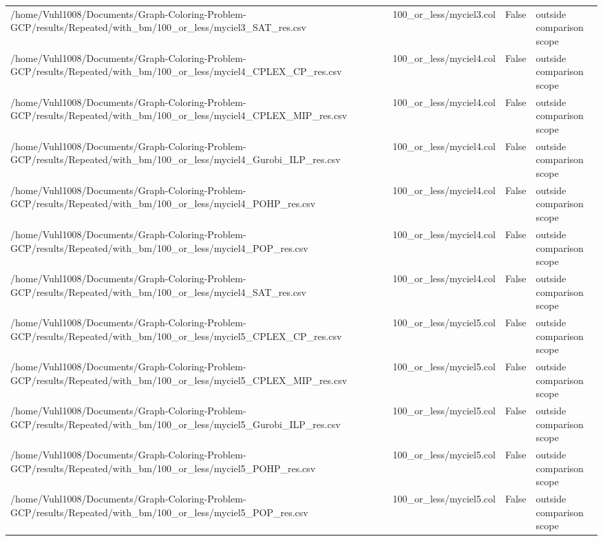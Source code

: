 \begin{table}[htbp]
\begin{tabular}{llll}
/home/Vuhl1008/Documents/Graph-Coloring-Problem-GCP/results/Repeated/with\_bm/100\_or\_less/myciel3\_SAT\_res.csv & 100\_or\_less/myciel3.col & False & outside comparison scope \\
/home/Vuhl1008/Documents/Graph-Coloring-Problem-GCP/results/Repeated/with\_bm/100\_or\_less/myciel4\_CPLEX\_CP\_res.csv & 100\_or\_less/myciel4.col & False & outside comparison scope \\
/home/Vuhl1008/Documents/Graph-Coloring-Problem-GCP/results/Repeated/with\_bm/100\_or\_less/myciel4\_CPLEX\_MIP\_res.csv & 100\_or\_less/myciel4.col & False & outside comparison scope \\
/home/Vuhl1008/Documents/Graph-Coloring-Problem-GCP/results/Repeated/with\_bm/100\_or\_less/myciel4\_Gurobi\_ILP\_res.csv & 100\_or\_less/myciel4.col & False & outside comparison scope \\
/home/Vuhl1008/Documents/Graph-Coloring-Problem-GCP/results/Repeated/with\_bm/100\_or\_less/myciel4\_POHP\_res.csv & 100\_or\_less/myciel4.col & False & outside comparison scope \\
/home/Vuhl1008/Documents/Graph-Coloring-Problem-GCP/results/Repeated/with\_bm/100\_or\_less/myciel4\_POP\_res.csv & 100\_or\_less/myciel4.col & False & outside comparison scope \\
/home/Vuhl1008/Documents/Graph-Coloring-Problem-GCP/results/Repeated/with\_bm/100\_or\_less/myciel4\_SAT\_res.csv & 100\_or\_less/myciel4.col & False & outside comparison scope \\
/home/Vuhl1008/Documents/Graph-Coloring-Problem-GCP/results/Repeated/with\_bm/100\_or\_less/myciel5\_CPLEX\_CP\_res.csv & 100\_or\_less/myciel5.col & False & outside comparison scope \\
/home/Vuhl1008/Documents/Graph-Coloring-Problem-GCP/results/Repeated/with\_bm/100\_or\_less/myciel5\_CPLEX\_MIP\_res.csv & 100\_or\_less/myciel5.col & False & outside comparison scope \\
/home/Vuhl1008/Documents/Graph-Coloring-Problem-GCP/results/Repeated/with\_bm/100\_or\_less/myciel5\_Gurobi\_ILP\_res.csv & 100\_or\_less/myciel5.col & False & outside comparison scope \\
/home/Vuhl1008/Documents/Graph-Coloring-Problem-GCP/results/Repeated/with\_bm/100\_or\_less/myciel5\_POHP\_res.csv & 100\_or\_less/myciel5.col & False & outside comparison scope \\
/home/Vuhl1008/Documents/Graph-Coloring-Problem-GCP/results/Repeated/with\_bm/100\_or\_less/myciel5\_POP\_res.csv & 100\_or\_less/myciel5.col & False & outside comparison scope \\

\end{tabular}
\end{table}

